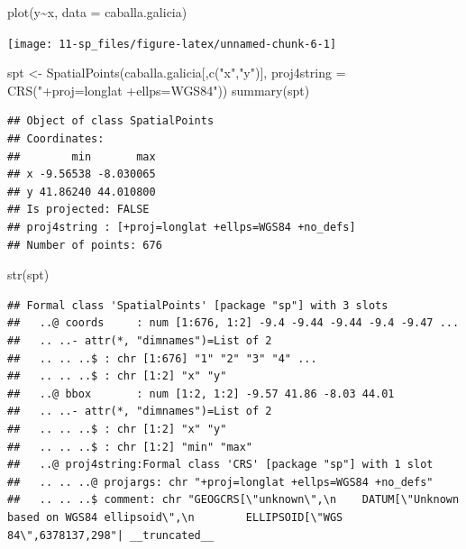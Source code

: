 \documentclass[
  spanish,
]{book}
\newenvironment{Shaded}{\begin{snugshade}}{\end{snugshade}}
\newcommand{\AttributeTok}[1]{\textcolor[rgb]{0.77,0.63,0.00}{#1}}
\newcommand{\FunctionTok}[1]{\textcolor[rgb]{0.00,0.00,0.00}{#1}}
\newcommand{\NormalTok}[1]{#1}
\newcommand{\OtherTok}[1]{\textcolor[rgb]{0.56,0.35,0.01}{#1}}
\newcommand{\SpecialCharTok}[1]{\textcolor[rgb]{0.00,0.00,0.00}{#1}}
\newcommand{\StringTok}[1]{\textcolor[rgb]{0.31,0.60,0.02}{#1}}
\theoremstyle{break}
\theoremstyle{definition}
\theoremstyle{definition}
\theoremstyle{definition}
\theoremstyle{definition}
\theoremstyle{remark}
\begin{document}
\begin{Shaded}
\begin{Highlighting}[]
\FunctionTok{plot}\NormalTok{(y}\SpecialCharTok{\textasciitilde{}}\NormalTok{x, }\AttributeTok{data =}\NormalTok{ caballa.galicia)}
\end{Highlighting}
\end{Shaded}

\begin{center}\texttt{[image: 11-sp\_files/figure-latex/unnamed-chunk-6-1]} \end{center}

\begin{Shaded}
\begin{Highlighting}[]
\NormalTok{spt }\OtherTok{\textless{}{-}} \FunctionTok{SpatialPoints}\NormalTok{(caballa.galicia[,}\FunctionTok{c}\NormalTok{(}\StringTok{"x"}\NormalTok{,}\StringTok{"y"}\NormalTok{)], }\AttributeTok{proj4string =} \FunctionTok{CRS}\NormalTok{(}\StringTok{"+proj=longlat +ellps=WGS84"}\NormalTok{))}
\FunctionTok{summary}\NormalTok{(spt)}
\end{Highlighting}
\end{Shaded}

\begin{verbatim}
## Object of class SpatialPoints
## Coordinates:
##        min       max
## x -9.56538 -8.030065
## y 41.86240 44.010800
## Is projected: FALSE 
## proj4string : [+proj=longlat +ellps=WGS84 +no_defs]
## Number of points: 676
\end{verbatim}

\begin{Shaded}
\begin{Highlighting}[]
\FunctionTok{str}\NormalTok{(spt)}
\end{Highlighting}
\end{Shaded}

\begin{verbatim}
## Formal class 'SpatialPoints' [package "sp"] with 3 slots
##   ..@ coords     : num [1:676, 1:2] -9.4 -9.44 -9.44 -9.4 -9.47 ...
##   .. ..- attr(*, "dimnames")=List of 2
##   .. .. ..$ : chr [1:676] "1" "2" "3" "4" ...
##   .. .. ..$ : chr [1:2] "x" "y"
##   ..@ bbox       : num [1:2, 1:2] -9.57 41.86 -8.03 44.01
##   .. ..- attr(*, "dimnames")=List of 2
##   .. .. ..$ : chr [1:2] "x" "y"
##   .. .. ..$ : chr [1:2] "min" "max"
##   ..@ proj4string:Formal class 'CRS' [package "sp"] with 1 slot
##   .. .. ..@ projargs: chr "+proj=longlat +ellps=WGS84 +no_defs"
##   .. .. ..$ comment: chr "GEOGCRS[\"unknown\",\n    DATUM[\"Unknown based on WGS84 ellipsoid\",\n        ELLIPSOID[\"WGS 84\",6378137,298"| __truncated__
\end{verbatim}
\end{document}
